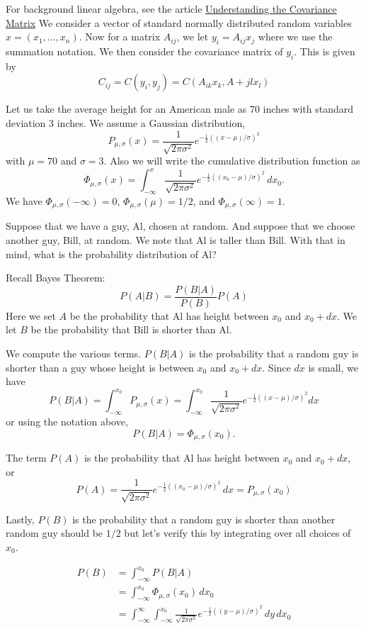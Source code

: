 \documentclass{article}
\begin{document}
For background linear algebra, see the article 
\href{https://datascienceplus.com/understanding-the-covariance-matrix/}{Understanding the Covariance Matrix}
We consider a vector of standard normally distributed random variables $x=(x_1,\dots,x_n)$. 
Now for a matrix $A_{ij}$, we let $y_i=A_{ij}x_j$ where we use the summation notation. We then consider the covariance matrix of $y_i$. This is given by 
$$
C_{ij}=C(y_i,y_j)=C(A_{ik}x_k,A+{jl}x_l)
$$

Let us take the average height for an American male as 70 inches with standard deviation 3 inches. We assume a Gaussian distribution,
$$
P_{\mu,\sigma}(x)=\frac{1}{\sqrt{2\pi \sigma^2}}e^{-\frac{1}{2}((x-\mu)/ \sigma)^2}
$$
with $\mu=70$ and $\sigma=3$. Also we will write the cumulative distribution function as
$$
\Phi_{\mu,\sigma}(x)= \int^x_{-\infty} 
\frac{1}{\sqrt{2\pi \sigma^2}}e^{-\frac{1}{2}((x_0-\mu)/ \sigma)^2} \, dx_0.
$$
We have $\Phi_{\mu,\sigma}(-\infty)=0$, $\Phi_{\mu,\sigma}(\mu)=1/2$, and $\Phi_{\mu,\sigma}(\infty)=1$. 

Suppose that we have a guy, Al, chosen at random. And suppose that we choose another guy, Bill, at random. We note that Al is taller than Bill. With that in mind, what is the probability distribution of Al?

Recall Bayes Theorem:
$$
P(A\vert B)= \frac{P(B\vert A)}{P(B)}P(A)
$$
Here we set $A$ be the probability that Al has height between $x_0$ and $x_0+dx$. We let $B$ be the probability that Bill is shorter than Al. 

We compute the various terms. $ P(B\vert A) $ is the probability that a random guy is shorter than a guy whose height is between $x_0$ and $x_0+dx$. Since $dx$ is small, we have
$$
P(B\vert A) = \int^{x_0}_{-\infty} P_{\mu,\sigma}(x)=\int^{x_0}_{-\infty}  \frac{1}{\sqrt{2\pi \sigma^2}}e^{-\frac{1}{2}((x-\mu)/ \sigma)^2} dx
$$
or using the notation above,
$$
P(B\vert A) = \Phi_{\mu,\sigma}(x_0).
$$


The term $P(A)$ is the probability that Al has height between $x_0$ and $x_0+dx$, or
$$
P(A) = \frac{1}{\sqrt{2\pi \sigma^2}}e^{-\frac{1}{2}((x_0-\mu)/ \sigma)^2}\, dx =
P_{\mu,\sigma}(x_0)
$$

Lastly, $P(B)$ is the probability that a random guy is shorter than another random guy should be $1/2$ but let's verify this by integrating over all choices of $x_0$.

\begin{align*}
   P(B) &= \int_{-\infty}^{x_0} P(B\vert A) \\
        &= \int_{-\infty}^{x_0} \Phi_{\mu,\sigma}(x_0) \, dx_0 \\
        &= \int_{-\infty}^{\infty} \int^{x_0}_{-\infty} 
\frac{1}{\sqrt{2\pi \sigma^2}}e^{-\frac{1}{2}((y-\mu)/ \sigma)^2} \, dy \, dx_0 \\
\end{align*}
\end{document}
